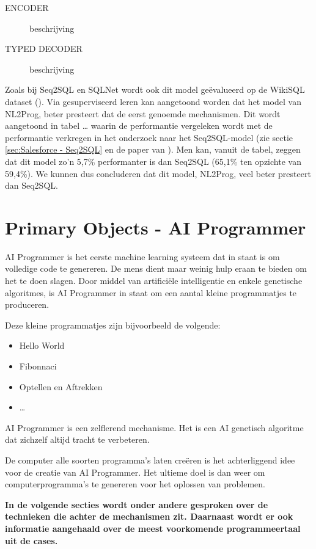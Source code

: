 \begin{description}
	\item[ENCODER] beschrijving
	\item[TYPED DECODER] beschrijving
\end{description}

Zoals bij Seq2SQL en SQLNet wordt ook dit model geëvalueerd op de WikiSQL dataset (\textcite{wikisql}). Via gesuperviseerd leren kan aangetoond worden dat het model van NL2Prog, beter presteert dat de eerst genoemde mechanismen. Dit wordt aangetoond in tabel … waarin de performantie vergeleken wordt met de performantie verkregen in het onderzoek naar het Seq2SQL-model (zie sectie  \ref{sec:Salesforce - Seq2SQL} en de paper van \textcite{seq2sqlPaper}). Men kan, vanuit de tabel, zeggen dat dit model zo’n 5,7\% performanter is dan Seq2SQL (65,1\% ten opzichte van 59,4\%). We kunnen dus concluderen dat dit model, NL2Prog, veel beter presteert dan Seq2SQL.

\section{Primary Objects - AI Programmer}

AI Programmer is het eerste machine learning systeem dat in staat is om volledige code te genereren. De mens dient maar weinig hulp eraan te bieden om het te doen slagen. Door middel van artificiële intelligentie en enkele genetische algoritmes, is AI Programmer in staat om een aantal kleine programmatjes te produceren. 

Deze kleine programmatjes zijn bijvoorbeeld de volgende:
\begin{itemize}
	\item Hello World
	\item Fibonnaci
	\item Optellen en Aftrekken
	\item \dots
\end{itemize}

AI Programmer is een zelflerend mechanisme. Het is een AI genetisch algoritme dat zichzelf altijd tracht te verbeteren.

De computer alle soorten programma’s laten creëren is het achterliggend idee voor de creatie van AI Programmer. Het ultieme doel is dan weer om computerprogramma’s te genereren voor het oplossen van problemen.

\textbf{In de volgende secties wordt onder andere gesproken over de technieken die achter de mechanismen zit. Daarnaast wordt er ook informatie aangehaald over de meest voorkomende programmeertaal uit de cases.}
